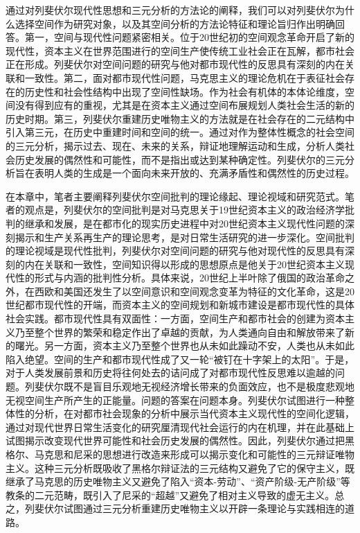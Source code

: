 \documentclass[UTF8, fontset = sourcesans, a4paper, oneside, zihao =
-4, scheme=chinese, no-math, space=true]{ctexbook}
\begin{document}
通过对列斐伏尔现代性思想和三元分析的方法论的阐释，我们可以对列斐伏尔为什么选择空间作为研究对象，以及其空间分析的方法论特征和理论旨归作出明确回答。第一，空间与现代性问题紧密相关。位于20世纪初的空间观念革命开启了新的现代性，资本主义在世界范围进行的空间生产使传统工业社会正在瓦解，都市社会正在形成。列斐伏尔对空间问题的研究与他对都市现代性的反思具有深刻的内在关联和一致性。第二，面对都市现代性问题，马克思主义的理论危机在于表征社会存在的历史性和社会性结构中出现了空间性缺场。作为社会有机体的本体论维度，空间没有得到应有的重视，尤其是在资本主义通过空间布展规划人类社会生活的新的历史时期。第三，列斐伏尔重建历史唯物主义的方法就是在社会存在的二元结构中引入第三元，在历史中重建时间和空间的统一。通过对作为整体性概念的社会空间的三元分析，揭示过去、现在、未来的关系，辩证地理解运动和生成，分析人类社会历史发展的偶然性和可能性，而不是指出或达到某种确定性。列斐伏尔的三元分析旨在表明人类的生成是一个面向未来开放的、充满矛盾性和偶然性的历史过程。

在本章中，笔者主要阐释列斐伏尔空间批判的理论缘起、理论视域和研究范式。笔者的观点是，列斐伏尔的空间批判是对马克思关于19世纪资本主义的政治经济学批判的继承和发展，是在都市化的现实历史进程中对20世纪资本主义现代性问题的深刻揭示和生产关系再生产的理论思考，是对日常生活研究的进一步深化。空间批判的理论视域是现代性批判，列斐伏尔对空间问题的研究与他对现代性的反思具有深刻的内在关联和一致性，空间知识得以形成的思想原点是他关于20世纪资本主义现代性的形式与内涵的批判性分析。具体来说，20世纪上半叶除了俄国的政治革命之外，在西欧和美国还发生了以空间意识和空间观念变革为特征的文化革命，这是20世纪都市现代性的开端，而资本主义的空间规划和新城市建设是都市现代性的具体社会实践。都市现代性具有双面性：一方面，空间生产和都市社会的创建为资本主义乃至整个世界的繁荣和稳定作出了卓越的贡献，为人类通向自由和解放带来了新的曙光。另一方面，资本主义乃至整个世界也从未如此躁动不安，人类也从未如此陷入绝望。空间的生产和都市现代性成了又一轮``被钉在十字架上的太阳''。于是，对于人类发展前景和历史将往何处去的诘问成了对都市现代性反思难以逾越的问题。列斐伏尔既不是盲目乐观地无视经济增长带来的负面效应，也不是极度悲观地无视空间生产所产生的正能量。问题的答案在问题本身。列斐伏尔试图进行一种整体性的分析，在对都市社会现象的分析中展示当代资本主义现代性的空间化逻辑，通过对现代世界日常生活变化的研究厘清现代社会运行的内在机理，并在此基础上试图揭示改变现代世界可能性和社会历史发展的偶然性。因此，列斐伏尔通过把黑格尔、马克思和尼采的思想进行改造来形成可以揭示变化和可能性的三元辩证唯物主义。这种三元分析既吸收了黑格尔辩证法的三元结构又避免了它的保守主义，既继承了马克思的历史唯物主义又避免了陷入``资本-劳动''、``资产阶级-无产阶级''等教条的二元范畴，既引入了尼采的``超越''又避免了相对主义导致的虚无主义。总之，列斐伏尔试图通过三元分析重建历史唯物主义以开辟一条理论与实践相连的道路。
\end{document}
